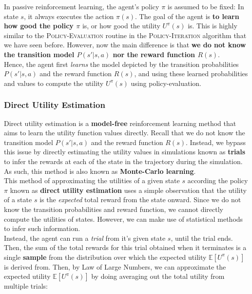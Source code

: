 \documentclass[11pt]{article}
\begin{document}
In passive reinforcement learning, the agent's policy $\pi$ is assumed to be fixed: In state $s$, it always executes the action $\pi(s)$. The goal of the agent is \textbf{to learn how good the policy $\pi$} is, or how good the utility $U^{\pi}(s)$ is. This is highly similar to the \textsc{Policy-Evaluation} routine in the \textsc{Policy-Iteration} algorithm that we have seen before. However, now the main difference is that \textbf{we do not know the transition model $P(s' | s, a)$ nor the reward function $R(s)$}.\\

Hence, the agent first \textit{learns} the model depicted by the transition probabilities $P(s' | s, a)$ and the reward function $R(s)$, and using these learned probabilities and values to compute the utility $U^{\pi}(s)$ using policy-evaluation.

\subsubsection{Direct Utility Estimation}

Direct utility estimation is a \textbf{model-free} reinforcement learning method that aims to learn the utility function values directly. Recall that we do not know the transition model $P(s' | s, a)$ and the reward function $R(s)$. Instead, we bypass this issue by directly estimating the utility values in simulations known as \textbf{trials} to infer the rewards at each of the state in the trajectory during the simulation. As such, this method is also known as \textbf{Monte-Carlo learning}.\\

This method of approximating the utilities of a given state $s$ according the policy $\pi$ known as \textbf{direct utility estimation} uses a simple observation that the utility of a state $s$ is the \textit{expected} total reward from the state onward. Since we do not know the transition probabilities and reward function, we cannot directly compute the utilities of states. However, we can make use of statistical methods to infer such information. \\

Instead, the agent can run a \textit{trial} from it's given state $s$, until the trial ends. Then, the sum of the total rewards for this trial obtained when it terminates is a single \textbf{sample} from the distribution over which the expected utility $\mathbb{E}[U^{\pi}(s)]$ is derived from. Then, by Law of Large Numbers, we can approximate the expected utility $\mathbb{E}[U^{\pi}(s)]$ by doing averaging out the total utility from multiple trials:
\end{document}
